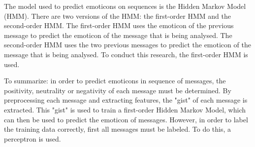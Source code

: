 The model used to predict emoticons on sequences is the Hidden Markov Model (HMM). There are two versions of the HMM: the first-order HMM and the second-order HMM. The first-order HMM uses the emoticon of the previous message to predict the emoticon of the message that is being analysed. The second-order HMM uses the two previous messages to predict the emoticon of the message that is being analysed. To conduct this research, the first-order HMM is used.

To summarize: in order to predict emoticons in sequence of messages, the positivity, neutrality or negativity of each message must be determined. By preprocessing each message and extracting features, the "gist" of each message is extracted. This "gist" is used to train a first-order Hidden Markov Model, which can then be used to predict the emoticon of messages. However, in order to label the training data correctly, first all messages must be labeled. To do this, a perceptron is used.